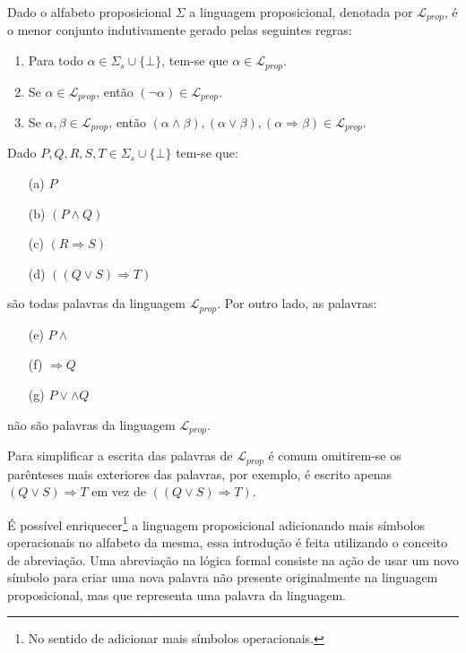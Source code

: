 \begin{definition}\label{def:LingProp}
    Dado o alfabeto proposicional $\Sigma$ a linguagem proposicional, denotada por $\mathcal{L}_{prop}$, é o menor conjunto indutivamente gerado pelas seguintes regras:
    \begin{enumerate}
        \item Para todo $\alpha \in \Sigma_s \cup \{\bot\}$, tem-se que $\alpha \in \mathcal{L}_{prop}$.
        \item Se $\alpha \in \mathcal{L}_{prop}$, então $(\neg\alpha) \in \mathcal{L}_{prop}$.
        \item Se $\alpha, \beta \in \mathcal{L}_{prop}$, então $(\alpha \land \beta), (\alpha \lor \beta), (\alpha \Rightarrow \beta) \in \mathcal{L}_{prop}$. 
    \end{enumerate}
\end{definition}

\begin{exem}\label{exe:PalavrasProposicionaisBemFormadas}
    Dado $P, Q, R, S, T \in \Sigma_s \cup \{\bot\}$ tem-se que:
    \begin{itemize}
        \item[(a)] $P$
        \item[(b)] $(P \land Q)$
        \item[(c)] $(R \Rightarrow S)$
        \item[(d)] $((Q \lor S) \Rightarrow T)$
    \end{itemize}
    são todas palavras da linguagem $\mathcal{L}_{prop}$. Por outro lado, as palavras:
    \begin{itemize}
        \item[(e)] $P \land$
        \item[(f)] $\Rightarrow Q$
        \item[(g)] $P \lor \land Q$
    \end{itemize}
    não são palavras da linguagem $\mathcal{L}_{prop}$.
\end{exem}

\begin{rema}
    Para simplificar a escrita das palavras de $\mathcal{L}_{prop}$ é comum omitirem-se os parênteses mais exteriores das palavras, por exemplo, é escrito apenas $(Q \lor S) \Rightarrow T$ em vez de $((Q \lor S) \Rightarrow T)$. 
\end{rema}

É possível enriquecer\footnote{No sentido de adicionar mais símbolos operacionais.} a linguagem proposicional adicionando mais símbolos operacionais no alfabeto da mesma, essa introdução é feita utilizando o conceito de abreviação. Uma abreviação na lógica formal consiste na ação de usar um novo símbolo para criar uma nova palavra não presente originalmente na linguagem proposicional, mas que representa uma palavra da linguagem. 

